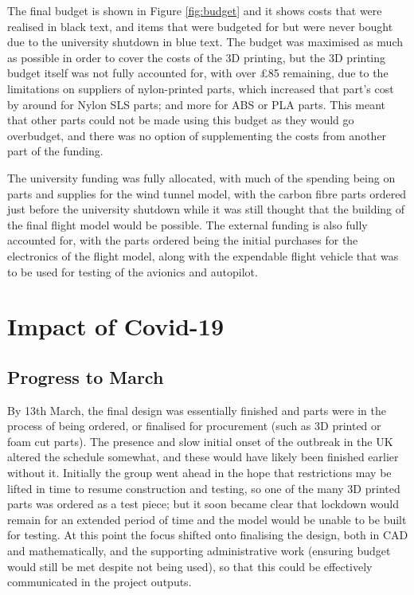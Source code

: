 \documentclass[../../main.tex]{subfiles}
\begin{document}

The final budget is shown in Figure \ref{fig:budget} and it shows costs that were realised in black text, and items that were budgeted for but were never bought due to the university shutdown in blue text.
The budget was maximised as much as possible in order to cover the costs of the 3D printing, but the 3D printing budget itself was not fully accounted for, with over £85 remaining, due to the limitations on suppliers of nylon-printed parts, which increased that part's cost by around  for Nylon SLS parts; and more for ABS or PLA parts.
This meant that other parts could not be made using this budget as they would go overbudget, and there was no option of supplementing the costs from another part of the funding.

The university funding was fully allocated, with much of the spending being on parts and supplies for the wind tunnel model, with the carbon fibre parts ordered just before the university shutdown while it was still thought that the building of the final flight model would be possible.
The external funding is also fully accounted for, with the parts ordered being the initial purchases for the electronics of the flight model, along with the expendable flight vehicle that was to be used for testing of the avionics and autopilot. 

\section{Impact of Covid-19} \label{sec:project-review:impact-of-covid-19}

\subsection{Progress to March} \label{sec:project-review:impact-of-covid-19:progress-to-march}

By 13th March, the final design was essentially finished and parts were in the process of being ordered, or finalised for procurement (such as 3D printed or foam cut parts).
The presence and slow initial onset of the outbreak in the UK altered the schedule somewhat, and these would have likely been finished earlier without it.
Initially the group went ahead in the hope that restrictions may be lifted in time to resume construction and testing, so one of the many 3D printed parts was ordered as a test piece; but it soon became clear that lockdown would remain for an extended period of time and the model would be unable to be built for testing.
At this point the focus shifted onto finalising the design, both in CAD and mathematically, and the supporting administrative work (ensuring budget would still be met despite not being used), so that this could be effectively communicated in the project outputs. 
\end{document}
